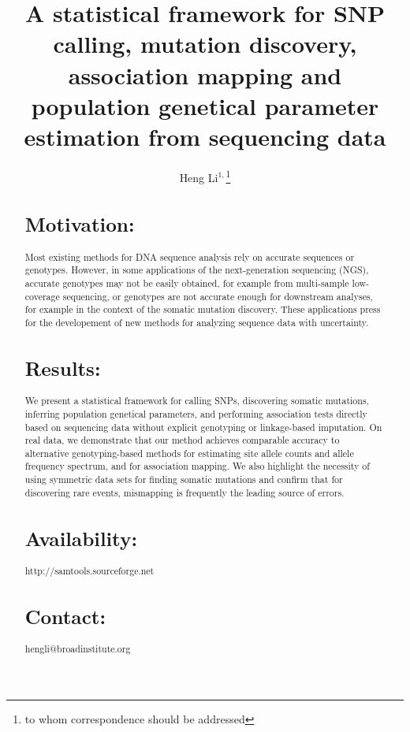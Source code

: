\documentclass{bioinfo}
\begin{document}

\title[Inference using sequencing data]{A statistical framework for SNP calling, mutation discovery,
		association mapping and population genetical parameter estimation from sequencing data}

\author[Li]{Heng Li$^{1,}$\footnote{to whom correspondence should be addressed}}

\address{$^1$Broad Institute, 7 Cambridge Center, Cambridge, MA 02142, USA}

\maketitle

\begin{abstract}
\section{Motivation:}
Most existing methods for DNA sequence analysis rely on accurate sequences or
genotypes.  However, in some applications of the next-generation sequencing
(NGS), accurate genotypes may not be easily obtained, for example from
multi-sample low-coverage sequencing, or genotypes are not accurate enough for
downstream analyses, for example in the context of the somatic mutation discovery.
These applications press for the developement of new methods for analyzing
sequence data with uncertainty.
\section{Results:}
We present a statistical framework for calling SNPs, discovering somatic
mutations, inferring population genetical parameters, and performing
association tests directly based on sequencing data without explicit genotyping
or linkage-based imputation. On real data, we demonstrate that our method
achieves comparable accuracy to alternative genotyping-based methods for
estimating site allele counts and allele frequency spectrum, and for
association mapping. We also highlight the necessity of using symmetric data
sets for finding somatic mutations and confirm that for discovering rare
events, mismapping is frequently the leading source of errors.
\section{Availability:} http://samtools.sourceforge.net
\section{Contact:} hengli@broadinstitute.org
\end{abstract}
\end{document}
